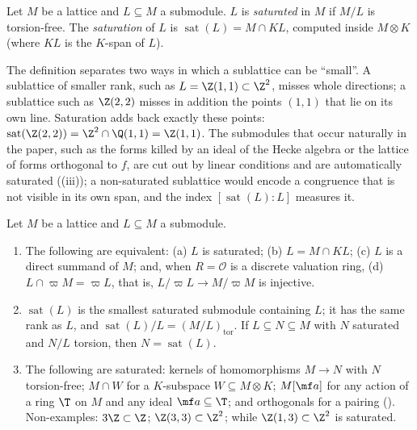 \begin{definition}[saturation]\label{def:modules:saturated}
Let $M$ be a lattice and $L\subseteq M$ a submodule. $L$ is \emph{saturated} in $M$ if $M/L$ is torsion-free. The \emph{saturation} of $L$ is
$\operatorname{sat}(L)=M\cap KL$, computed inside $M\otimes K$ (where $KL$ is the $K$-span of $L$).
\end{definition}

The definition separates two ways in which a sublattice can be ``small''. A sublattice of smaller rank, such as $L=\Z(1,1)\subset\Z^2$, misses
whole directions; a sublattice such as $\Z(2,2)$ misses in addition the points $(1,1)$ that lie on its own line. Saturation adds back exactly
these points: $\operatorname{sat}(\Z(2,2))=\Z^2\cap\Q(1,1)=\Z(1,1)$. The submodules that occur naturally in the paper, such as the forms killed
by an ideal of the Hecke algebra or the lattice of forms orthogonal to $f$, are cut out by linear conditions and are automatically saturated
((iii)); a non-saturated sublattice would encode a congruence that is not visible in its own span, and the
index $[\operatorname{sat}(L):L]$ measures it.

\begin{proposition}\label{prop:modules:saturated}
Let $M$ be a lattice and $L\subseteq M$ a submodule.
\begin{enumerate}[label=(\roman*)]
\item The following are equivalent: (a) $L$ is saturated; (b) $L=M\cap KL$; (c) $L$ is a direct summand of $M$; and, when
$R=\mathcal O$ is a discrete valuation ring, (d) $L\cap\varpi M=\varpi L$, that is, $L/\varpi L\to M/\varpi M$ is injective.
\item $\operatorname{sat}(L)$ is the smallest saturated submodule containing $L$; it has the same rank as $L$, and $\operatorname{sat}(L)/L=(M/L)_{\mathrm{tor}}$. If
$L\subseteq N\subseteq M$ with $N$ saturated and $N/L$ torsion, then $N=\operatorname{sat}(L)$.
\item The following are saturated: kernels of homomorphisms $M\to N$ with $N$ torsion-free; $M\cap W$ for a $K$-subspace
$W\subseteq M\otimes K$; $M[\mf a]$ for any action of a ring $\T$ on $M$ and any ideal $\mf a\subseteq\T$; and orthogonals for a pairing
(). Non-examples: $3\Z\subset\Z$; $\Z(3,3)\subset\Z^2$; while $\Z(1,3)\subset\Z^2$ is saturated.
\end{enumerate}
\end{proposition}

